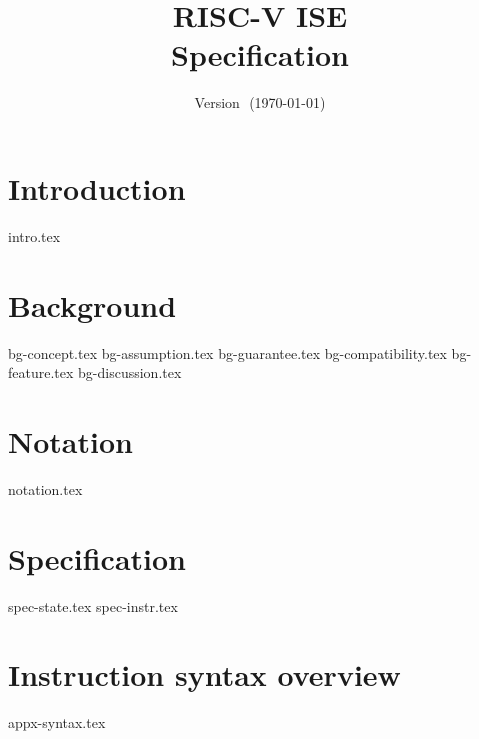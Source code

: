 \documentclass{article}
\title{RISC-V \XCID ISE \\ Specification}
\author{}
\date{Version $$ (\today)}
\begin{document}
\maketitle \tableofcontents


\section{Introduction}
\label{sec:intro}

{intro.tex}

\section{Background}
\label{sec:bg}

{bg-concept.tex}
{bg-assumption.tex}
{bg-guarantee.tex}
{bg-compatibility.tex}
{bg-feature.tex}
{bg-discussion.tex}

\section{Notation}
\label{sec:notation}

{notation.tex}

\section{Specification}
\label{sec:spec}

{spec-state.tex}
{spec-instr.tex}


\newpage
\printbibliography


\appendix

\newpage
\section{Instruction syntax   overview}
\label{appx:syntax}

{appx-syntax.tex}
\end{document}
